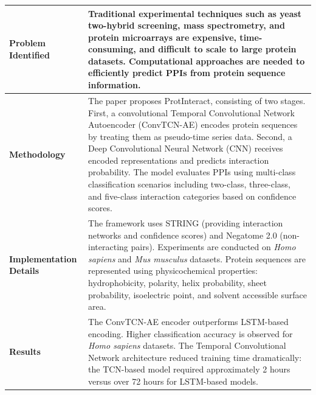 \documentclass[12pt,a4paper]{report}
\begin{document}
\begin{table}[H]
\centering
\renewcommand{\arraystretch}{1.5}
\begin{tabular}{|p{}|p{}|}
\hline
\textbf{Problem Identified} & Traditional experimental techniques such as yeast two-hybrid screening, mass spectrometry, and protein microarrays are expensive, time-consuming, and difficult to scale to large protein datasets. Computational approaches are needed to efficiently predict PPIs from protein sequence information. \\ \hline
\textbf{Methodology} & The paper proposes ProtInteract, consisting of two stages. First, a convolutional Temporal Convolutional Network Autoencoder (ConvTCN-AE) encodes protein sequences by treating them as pseudo-time series data. Second, a Deep Convolutional Neural Network (CNN) receives encoded representations and predicts interaction probability. The model evaluates PPIs using multi-class classification scenarios including two-class, three-class, and five-class interaction categories based on confidence scores. \\ \hline
\textbf{Implementation Details} & The framework uses STRING (providing interaction networks and confidence scores) and Negatome 2.0 (non-interacting pairs). Experiments are conducted on \textit{Homo sapiens} and \textit{Mus musculus} datasets. Protein sequences are represented using physicochemical properties: hydrophobicity, polarity, helix probability, sheet probability, isoelectric point, and solvent accessible surface area. \\ \hline
\textbf{Results} & The ConvTCN-AE encoder outperforms LSTM-based encoding. Higher classification accuracy is observed for \textit{Homo sapiens} datasets. The Temporal Convolutional Network architecture reduced training time dramatically: the TCN-based model required approximately 2 hours versus over 72 hours for LSTM-based models. \\ \hline
\end{tabular}
\end{table}

\newpage
\end{document}
